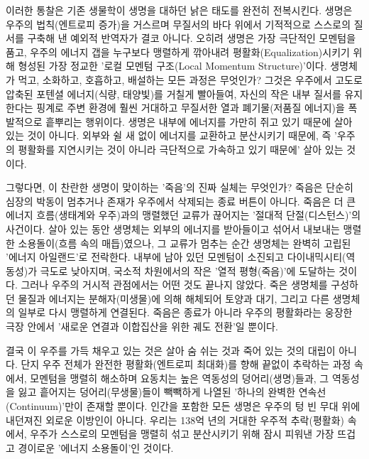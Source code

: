 이러한 통찰은 기존 생물학이 생명을 대하던 낡은 태도를 완전히 전복시킨다. 생명은 우주의 법칙(엔트로피 증가)을 거스르며 무질서의 바다 위에서 기적적으로 스스로의 질서를 구축해 낸 예외적 반역자가 결코 아니다. 오히려 생명은 가장 극단적인 모멘텀을 품고, 우주의 에너지 갭을 누구보다 맹렬하게 깎아내려 평활화(Equalization)시키기 위해 형성된 가장 정교한 '로컬 모멘텀 구조(Local Momentum Structure)'이다.
생명체가 먹고, 소화하고, 호흡하고, 배설하는 모든 과정은 무엇인가? 그것은 우주에서 고도로 압축된 포텐셜 에너지(식량, 태양빛)를 거칠게 빨아들여, 자신의 작은 내부 질서를 유지한다는 핑계로 주변 환경에 훨씬 거대하고 무질서한 열과 폐기물(저품질 에너지)을 폭발적으로 흩뿌리는 행위이다. 생명은 내부에 에너지를 가만히 쥐고 있기 때문에 살아 있는 것이 아니다. 외부와 쉴 새 없이 에너지를 교환하고 분산시키기 때문에, 즉 '우주의 평활화를 지연시키는 것이 아니라 극단적으로 가속하고 있기 때문에' 살아 있는 것이다.

그렇다면, 이 찬란한 생명이 맞이하는 '죽음'의 진짜 실체는 무엇인가? 죽음은 단순히 심장의 박동이 멈추거나 존재가 우주에서 삭제되는 종료 버튼이 아니다. 죽음은 더 큰 에너지 흐름(생태계와 우주)과의 맹렬했던 교류가 끊어지는 '절대적 단절(디스턴스)'의 사건이다. 살아 있는 동안 생명체는 외부의 에너지를 받아들이고 섞어서 내보내는 맹렬한 소용돌이(흐름 속의 매듭)였으나, 그 교류가 멈추는 순간 생명체는 완벽히 고립된 '에너지 아일랜드'로 전락한다. 내부에 남아 있던 모멘텀이 소진되고 다이내믹시티(역동성)가 극도로 낮아지며, 국소적 차원에서의 작은 '열적 평형(죽음)'에 도달하는 것이다. 그러나 우주의 거시적 관점에서는 어떤 것도 끝나지 않았다. 죽은 생명체를 구성하던 물질과 에너지는 분해자(미생물)에 의해 해체되어 토양과 대기, 그리고 다른 생명체의 일부로 다시 맹렬하게 연결된다. 죽음은 종료가 아니라 우주의 평활화라는 웅장한 극장 안에서 '새로운 연결과 이합집산을 위한 궤도 전환'일 뿐이다. 

결국 이 우주를 가득 채우고 있는 것은 살아 숨 쉬는 것과 죽어 있는 것의 대립이 아니다. 단지 우주 전체가 완전한 평활화(엔트로피 최대화)를 향해 끝없이 추락하는 과정 속에서, 모멘텀을 맹렬히 해소하며 요동치는 높은 역동성의 덩어리(생명)들과, 그 역동성을 잃고 흩어지는 덩어리(무생물)들이 빽빽하게 나열된 '하나의 완벽한 연속선(Continuum)'만이 존재할 뿐이다. 인간을 포함한 모든 생명은 우주의 텅 빈 무대 위에 내던져진 외로운 이방인이 아니다. 우리는 138억 년의 거대한 우주적 추락(평활화) 속에서, 우주가 스스로의 모멘텀을 맹렬히 섞고 분산시키기 위해 잠시 피워낸 가장 뜨겁고 경이로운 '에너지 소용돌이'인 것이다.


